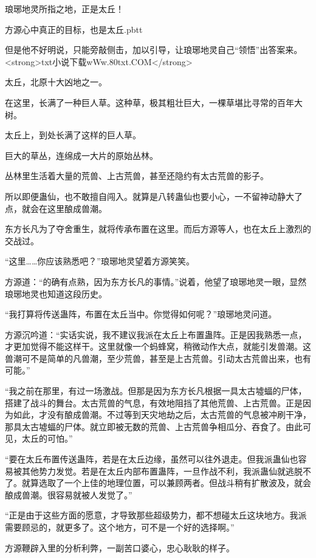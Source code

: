 
\begin{this_body}

琅琊地灵所指之地，正是太丘！

方源心中真正的目标，也是太丘.pbtt

但是他不好明说，只能旁敲侧击，加以引导，让琅琊地灵自己“领悟”出答案来。<strong>txt小说下载wWw.80txt.COM</strong>

太丘，北原十大凶地之一。

在这里，长满了一种巨人草。这种草，极其粗壮巨大，一棵草堪比寻常的百年大树。

太丘上，到处长满了这样的巨人草。

巨大的草丛，连绵成一大片的原始丛林。

丛林里生活着大量的荒兽、上古荒兽，甚至还隐约有太古荒兽的影子。

所以即便蛊仙，也不敢擅自闯入。就算是八转蛊仙也要小心，一不留神动静大了点，就会在这里酿成兽潮。

东方长凡为了夺舍重生，就将传承布置在这里。而后方源等人，也在太丘上激烈的交战过。

“这里……你应该熟悉吧？”琅琊地灵望着方源笑笑。

方源道：“的确有点熟，因为东方长凡的事情。”说着，他望了琅琊地灵一眼，显然琅琊地灵也知道这段历史。

“我打算将传送蛊阵，布置在太丘当中。你觉得如何呢？”琅琊地灵问道。

方源沉吟道：“实话实说，我不建议我派在太丘上布置蛊阵。正是因我熟悉一点，才更加觉得不能这样干。这里就像一个蚂蜂窝，稍微动作大点，就能引发兽潮。这兽潮可不是简单的凡兽潮，至少荒兽，甚至是上古荒兽。引动太古荒兽出来，也有可能。”

“我之前在那里，有过一场激战。但那是因为东方长凡根据一具太古墟蝠的尸体，搭建了战斗的舞台。太古荒兽的气息，有效地阻挡了其他荒兽、上古荒兽。正是因为如此，才没有酿成兽潮。不过等到天灾地劫之后，太古荒兽的气息被冲刷干净，那具太古墟蝠的尸体。就立即被无数的荒兽、上古荒兽争相瓜分、吞食了。由此可见，太丘的可怕。”

“要在太丘布置传送蛊阵，若是在太丘边缘，虽然可以往外退走。但我派蛊仙也容易被其他势力发觉。若是在太丘内部布置蛊阵，一旦作战不利，我派蛊仙就逃脱不了。就算选取了一个上佳的地理位置，可以兼顾两者。但战斗稍有扩散波及，就会酿成兽潮。很容易就被人发觉了。”

“正是由于这些方面的愿意，才导致那些超级势力，都不想碰太丘这块地方。我派需要顾忌的，就更多了。这个地方，可不是一个好的选择啊。”

方源鞭辟入里的分析利弊，一副苦口婆心，忠心耿耿的样子。


\end{this_body}
